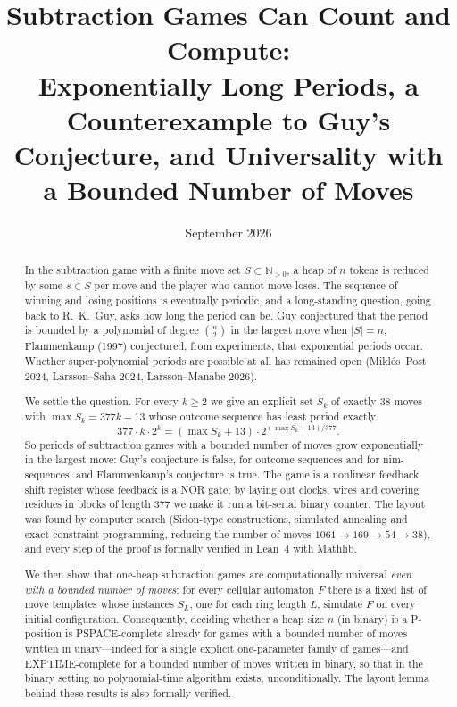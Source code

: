 \documentclass[11pt]{article}
\title{Subtraction Games Can Count and Compute:\\ Exponentially Long Periods, a Counterexample to Guy's
Conjecture, and Universality with a Bounded Number of Moves}
\author{}
\date{September 2026}
\theoremstyle{definition}
\newcommand{\N}{\mathbb{N}}
\newcommand{\nmoves}{38}
\begin{document}
\maketitle

\begin{abstract}
In the subtraction game with a finite move set $S\subset\N_{>0}$, a heap of $n$ tokens is reduced
by some $s\in S$ per move and the player who cannot move loses.  The sequence of winning and losing
positions is eventually periodic, and a long-standing question, going back to R.~K.~Guy, asks how
long the period can be.  Guy conjectured that the period is bounded by a polynomial of degree
$\binom{n}{2}$ in the largest move when $|S|=n$; Flammenkamp (1997) conjectured, from experiments,
that exponential periods occur.  Whether super-polynomial periods are possible at all has remained
open (Miklós--Post 2024, Larsson--Saha 2024, Larsson--Manabe 2026).

We settle the question.  For every $k\ge2$ we give an explicit set $S_k$ of exactly $\nmoves$ moves
with $\max S_k=377k-13$ whose outcome sequence has least period exactly
\[377\cdot k\cdot 2^k=(\max S_k+13)\cdot 2^{(\max S_k+13)/377}.\]
So periods of subtraction games with a bounded number of moves grow exponentially in the largest
move: Guy's conjecture is false, for outcome sequences and for nim-sequences, and Flammenkamp's
conjecture is true.  The game is a nonlinear feedback shift register whose feedback is a NOR gate;
by laying out clocks, wires and covering residues in blocks of length $377$ we make it run a
bit-serial binary counter.  The layout was found by computer search (Sidon-type constructions,
simulated annealing and exact constraint programming, reducing the number of moves
$1061\to169\to54\to\nmoves$), and every step of the proof is formally verified in Lean~4 with
Mathlib.

We then show that one-heap subtraction games are computationally universal \emph{even with a
bounded number of moves}: for every cellular automaton $F$ there is a fixed list of move templates
whose instances $S_L$, one for each ring length $L$, simulate $F$ on every initial configuration.
Consequently, deciding whether a heap size $n$ (in binary) is a P-position is PSPACE-complete already
for games with a bounded number of moves written in unary---indeed for a single explicit
one-parameter family of games---and EXPTIME-complete for a bounded number of moves written in binary,
so that in the binary setting no polynomial-time algorithm exists, unconditionally.  The layout lemma
behind these results is also formally verified.
\end{abstract}
\end{document}
